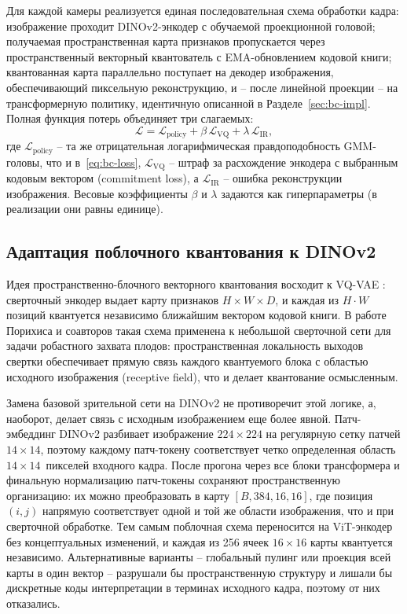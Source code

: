 Для каждой камеры реализуется единая последовательная схема обработки кадра: изображение проходит DINOv2-энкодер с обучаемой проекционной головой; получаемая пространственная карта признаков пропускается через пространственный векторный квантователь с EMA-обновлением кодовой книги; квантованная карта параллельно поступает на декодер изображения, обеспечивающий пиксельную реконструкцию, и -- после линейной проекции -- на трансформерную политику, идентичную описанной в Разделе~\ref{sec:bc-impl}. Полная функция потерь объединяет три слагаемых:
\begin{equation}
    \label{eq:vq-total-loss}
    \mathcal{L} = \mathcal{L}_{\text{policy}} + \beta \,\mathcal{L}_{\text{VQ}}
                  + \lambda \,\mathcal{L}_{\text{IR}},
\end{equation}
где $\mathcal{L}_{\text{policy}}$ -- та же отрицательная логарифмическая правдоподобность GMM-головы, что и в~\eqref{eq:bc-loss}, $\mathcal{L}_{\text{VQ}}$ -- штраф за расхождение энкодера с выбранным кодовым вектором (commitment loss), а $\mathcal{L}_{\text{IR}}$ -- ошибка реконструкции изображения. Весовые коэффициенты $\beta$ и $\lambda$ задаются как гиперпараметры (в реализации они равны
единице).

\subsection{Адаптация поблочного квантования к DINOv2}
\label{subsec:vq-block}

Идея пространственно-блочного векторного квантования восходит к VQ-VAE \cite{vandeoord2017neural}: сверточный энкодер выдает карту признаков $H{\times}W{\times}D$, и каждая из $H{\cdot}W$ позиций квантуется независимо ближайшим вектором кодовой книги. В работе Порихиса и соавторов \cite{porichis2024imitation} такая схема применена к небольшой сверточной сети для задачи робастного захвата плодов: пространственная локальность выходов свертки обеспечивает прямую связь каждого квантуемого блока с областью исходного изображения (receptive field), что и делает квантование осмысленным.

Замена базовой зрительной сети на DINOv2 не противоречит этой логике, а, наоборот, делает связь с исходным изображением еще более явной. Патч-эмбеддинг DINOv2 разбивает изображение $224{\times}224$ на регулярную сетку патчей $14{\times}14$, поэтому каждому патч-токену соответствует четко определенная область $14{\times}14$~пикселей входного кадра. После прогона через все блоки трансформера и финальную нормализацию патч-токены сохраняют пространственную организацию: их можно преобразовать в карту $[B, 384, 16, 16]$, где позиция $(i,j)$ напрямую соответствует одной и той же области изображения, что и при сверточной обработке. Тем самым поблочная схема \cite{vandeoord2017neural, esser2021taming, porichis2024imitation} переносится на ViT-энкодер без концептуальных изменений, и каждая из 256 ячеек $16{\times}16$ карты квантуется независимо. Альтернативные варианты -- глобальный пулинг или проекция всей карты в один вектор -- разрушали бы пространственную структуру и лишали бы дискретные коды интерпретации в терминах исходного кадра, поэтому от них отказались.

